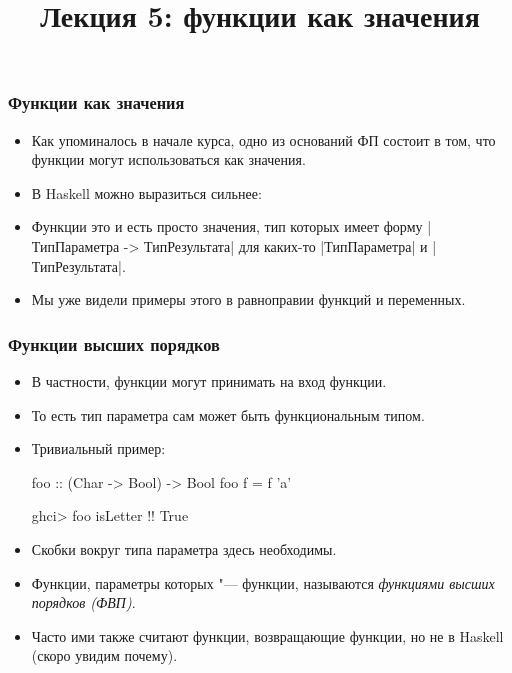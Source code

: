 \documentclass[10pt]{beamer}
\title{Лекция 5: функции как значения}
\begin{document}
\begin{frame}[plain]
  \maketitle
\end{frame}

\begin{frame}[fragile]
  \frametitle{Функции как значения}
  \begin{itemize}
    \item Как упоминалось в начале курса, одно из оснований ФП состоит в том, что функции могут использоваться как значения.
    \item В Haskell можно выразиться сильнее:\pause
    \item Функции это и есть просто значения, тип которых имеет форму \haskinline|ТипПараметра -> ТипРезультата| для каких-то \haskinline|ТипПараметра| и \haskinline|ТипРезультата|.\pause
    \item Мы уже видели примеры этого в равноправии функций и переменных.
  \end{itemize}
\end{frame}

\begin{frame}[fragile]
  \frametitle{Функции высших порядков}
  \begin{itemize}
    \item В частности, функции могут принимать на вход функции.
    \item То есть тип параметра сам может быть функциональным типом.
    \item Тривиальный пример:
          \begin{haskell}
            foo :: (Char -> Bool) -> Bool
            foo f = f 'a'

            ghci> foo isLetter !\pause!
            True
          \end{haskell}
    \item Скобки вокруг типа параметра здесь необходимы.\pause
    \item Функции, параметры которых "--- функции, называются \emph{функциями высших порядков (ФВП)}.\pause
    \item Часто ими также считают функции, возвращающие функции, но не в Haskell (скоро увидим почему).
  \end{itemize}
\end{frame}
\end{document}
